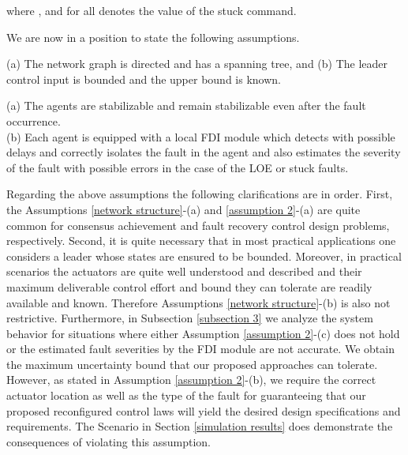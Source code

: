 \documentclass[12pt,draftcls,onecolumn]{IEEEtran}
\begin{document}
where , and  for all  denotes the value of the stuck command. \par
We are now in a position to state the following assumptions. 
\begin{assumptions}\label{network structure}
(a) The network graph is directed and  has a spanning tree, and 
(b) The leader control input is bounded and the upper bound is known.
 \end{assumptions}
 \begin{assumptions}\label{assumption 2}
(a) The agents are stabilizable and remain stabilizable even after the fault occurrence.\\
(b) Each agent is equipped with a local FDI module which detects with possible delays and correctly isolates the fault in the agent and also estimates the severity of the fault with possible errors in the case of the LOE or stuck faults. 
\end{assumptions}
Regarding the above assumptions the following clarifications are in order. First, the Assumptions \ref{network structure}-(a) and  \ref{assumption 2}-(a)  are  quite common   for consensus achievement and fault recovery control design problems, respectively.   
Second, it is quite necessary that in most
practical applications one considers a leader whose states
are ensured to be bounded. Moreover, in practical scenarios
the actuators are quite well understood and described
and their maximum deliverable control effort and bound they can tolerate are readily available and known. Therefore Assumptions \ref{network structure}-(b) is also not  restrictive. Furthermore, in Subsection \ref{subsection 3} we analyze the system behavior for situations where either Assumption \ref{assumption 2}-(c) does not hold or 
  the estimated fault severities by the FDI module are not accurate. We obtain the maximum uncertainty bound that our proposed approaches can tolerate.  However, as stated in Assumption \ref{assumption 2}-(b),  we require the correct actuator location  as well as the type of the fault for guaranteeing that our proposed reconfigured control laws will yield the desired design specifications and requirements. The Scenario  in Section \ref{simulation results} does demonstrate the consequences of violating this assumption.
 
\end{document}
